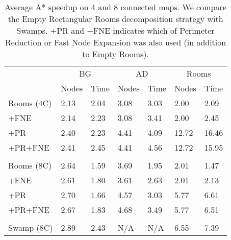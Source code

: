 \begin{table}[tb]
\caption{Average A* speedup on 4 and 8 connected maps.
We compare the Empty Rectangular Rooms decomposition strategy with Swamps.
+PR and +FNE indicates which of Perimeter Reduction or Fast Node Expansion was
also used (in addition to Empty Rooms).}
\label{table-speedup}


\begin{center}
\begin{tabular*}{\columnwidth}{p{1.8cm}m{0.62cm}m{0.62cm}m{0.62cm}m{0.62cm}m{0.62cm}m{0.62cm}}
  \hline
   & \multicolumn{2}{c}{BG} & \multicolumn{2}{c}{AD} & \multicolumn{2}{c}{Rooms}\\
	& Nodes & Time & Nodes & Time & Nodes & Time \\
  \hline

	Rooms (4C) & 2.13 & 2.04 & 3.08 & 3.03 & 2.00 & 2.09 \\ 
	+FNE  & 2.14 & 2.23 & 3.08 & 3.41 & 2.00 & 2.45 \\ 
	+PR  & 2.40 & 2.23 & 4.41 & 4.09 & 12.72 & 16.46 \\ 
	+PR+FNE & 2.41 & 2.45 & 4.41 & 4.56 & 12.72 & 15.95 \\  \\ 
	Rooms (8C) & 2.64 & 1.59 & 3.69 & 1.95 & 2.01 & 1.47 \\ 
	+FNE  & 2.61 & 1.80 & 3.61 & 2.63 & 2.01 & 2.13 \\ 
	+PR  & 2.70 & 1.66 & 4.57 & 3.03 & 5.77 & 6.61 \\ 
	+PR+FNE  & 2.67 & 1.83 & 4.68 & 3.49 & 5.77 & 6.51 \\  \\
	Swamp (8C) & 2.89 & 2.43 & N/A & N/A & 6.55 & 7.39 \\ 
   \hline
\end{tabular*}
\end{center}
\end{table}
